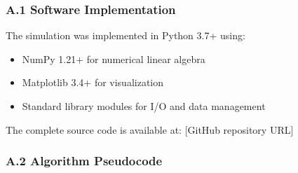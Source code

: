 \documentclass[
]{article}
\providecommand{\tightlist}{%
  \setlength{\itemsep}{0pt}\setlength{\parskip}{0pt}}
\begin{document}
\subsubsection{A.1 Software
Implementation}\label{a.1-software-implementation}

The simulation was implemented in Python 3.7+ using:

\begin{itemize}
\tightlist
\item
  NumPy 1.21+ for numerical linear algebra
\item
  Matplotlib 3.4+ for visualization
\item
  Standard library modules for I/O and data management
\end{itemize}

The complete source code is available at: {[}GitHub repository URL{]}

\subsubsection{A.2 Algorithm Pseudocode}\label{a.2-algorithm-pseudocode}
\end{document}
